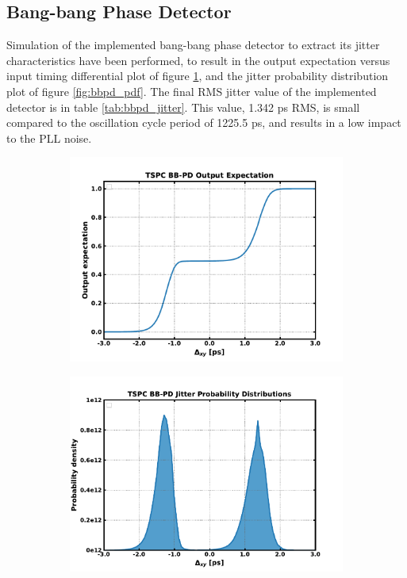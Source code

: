 \subsection{Bang-bang Phase Detector}\label{sec:res_bbpd}
Simulation of the implemented bang-bang phase detector to extract its jitter characteristics have been performed, to result in the output expectation versus input timing differential plot of figure \ref{fig:bbpd_cdf}, and the jitter probability distribution plot of figure \ref{fig:bbpd_pdf}. The final RMS jitter value of the implemented detector is in table \ref{tab:bbpd_jitter}. This value, 1.342 ps RMS, is small compared to the oscillation cycle period of 1225.5 ps, and results in a low impact to the PLL noise.
	\begin{figure}[htb!]
	    \centering
	    \begin{subfigure}{0.5\textwidth}
	        \centering
	        \includegraphics[width=1\textwidth, angle=0]{./figs/results/cdf}
	        \caption{ }
	        \label{fig:bbpd_cdf}
	    \end{subfigure}%
	    \begin{subfigure}{0.5\textwidth}
	        \centering
	        \includegraphics[width=1\textwidth, angle=0]{./figs/results/pdf}

\end{subfigure}
\end{figure}
